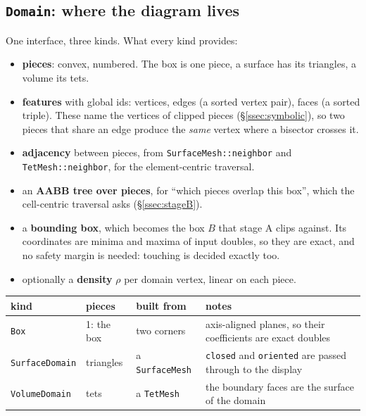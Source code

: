 \documentclass[11pt,a4paper]{article}
\newcommand{\code}[1]{\texttt{#1}}          %
\newcommand{\secref}[1]{\S\ref{#1}}
\begin{document}
\subsection{\texorpdfstring{\code{Domain}}{Domain}: where the diagram lives}\label{ssec:domain}

One interface, three kinds. What every kind provides:

\begin{itemize}
\item \textbf{pieces}: convex, numbered. The box is one piece, a surface has its triangles, a
  volume its tets.
\item \textbf{features} with global ids: vertices, edges (a sorted vertex pair), faces (a sorted
  triple). These name the vertices of clipped pieces (\secref{ssec:symbolic}), so two pieces that
  share an edge produce the \emph{same} vertex where a bisector crosses it.
\item \textbf{adjacency} between pieces, from \code{SurfaceMesh::neighbor} and
  \code{TetMesh::neighbor}, for the element-centric traversal.
\item an \textbf{AABB tree over pieces}, for ``which pieces overlap this box'', which the
  cell-centric traversal asks (\secref{ssec:stageB}).
\item a \textbf{bounding box}, which becomes the box $B$ that stage A clips against. Its
  coordinates are minima and maxima of input doubles, so they are exact, and no safety margin is
  needed: touching is decided exactly too.
\item optionally a \textbf{density} $\rho$ per domain vertex, linear on each piece.
\end{itemize}

{\small
\begin{xltabular}{\linewidth}{@{}P{2.8cm} P{2.1cm} P{2.6cm} L@{}}
\toprule
kind & pieces & built from & notes \\
\midrule
\endhead
\code{Box}           & 1: the box  & two corners        & axis-aligned planes, so their
                                                          coefficients are exact doubles \\
\code{SurfaceDomain} & triangles   & a \code{SurfaceMesh} & \code{closed} and \code{oriented}
                                                          are passed through to the display \\
\code{VolumeDomain}  & tets        & a \code{TetMesh}   & the boundary faces are the surface of
                                                          the domain \\
\bottomrule
\end{xltabular}}
\end{document}
